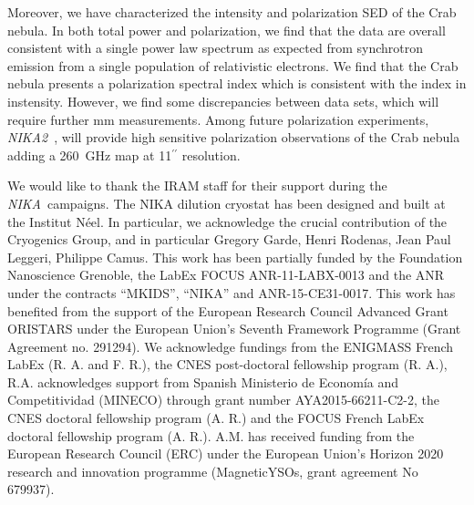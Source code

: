 \documentclass[twocolumn,traditabstract]{aa}
\def\NIKA{\textit{NIKA}}
\def\NIKAd{\textit{NIKA2}}
\begin{document}
Moreover, we have characterized the intensity and polarization SED of the Crab nebula. In both total power and polarization, we find that the data are overall consistent with a single power law spectrum as expected from synchrotron emission from a single population of relativistic electrons.
We find that the Crab nebula presents a polarization spectral index which is consistent with the index in instensity. 
However, we find some discrepancies between data sets, which will require further mm measurements. Among future polarization experiments, \NIKAd\ \citep{calvo2016}, will provide high sensitive polarization observations of the Crab nebula adding a 260~GHz map at 11$^{\prime\prime}$ resolution.



\vspace{0.2cm}
 \begin{acknowledgements}
We would like to thank the IRAM staff for their support during the \NIKA\ campaigns. 
The NIKA dilution cryostat has been designed and built at the Institut N\'eel. 
In particular, we acknowledge the crucial contribution of the Cryogenics Group, and 
in particular Gregory Garde, Henri Rodenas, Jean Paul Leggeri, Philippe Camus. 
This work has been partially funded by the Foundation Nanoscience Grenoble, the LabEx FOCUS ANR-11-LABX-0013 and 
the ANR under the contracts ``MKIDS'', ``NIKA'' and ANR-15-CE31-0017. 
This work has benefited from the support of the European Research Council Advanced Grant ORISTARS 
under the European Union's Seventh Framework Programme (Grant Agreement no. 291294).
We acknowledge fundings from the ENIGMASS French LabEx (R. A. and F. R.), 
the CNES post-doctoral fellowship program (R. A.), R.A. acknowledges support from Spanish Ministerio de Econom\'ia and Competitividad (MINECO) through grant number AYA2015-66211-C2-2, the CNES doctoral fellowship program (A. R.) and
the FOCUS French LabEx doctoral fellowship program (A. R.).
A.M. has received funding from the European Research Council (ERC) under the European Union’s Horizon 2020 research and innovation programme (MagneticYSOs, grant agreement No 679937).
\end{acknowledgements}
\end{document}
